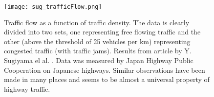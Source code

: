\begin{figure}[H]
    \begin{center}
    \texttt{[image: sug\_trafficFlow.png]}
    \caption{\label{sug_flow}
Traffic flow as a function of traffic density. The data is clearly divided
into two sets, one representing free flowing traffic and the other (above the
threshold of 25 vehicles per km) representing congested traffic (with traffic
jams).  Results from article by Y. Sugiyama el al. \cite{sugiyama}.  Data was
measured by Japan Highway Public Cooperation on Japanese highways. Similar
observations have been made in many places and seems to be almost a universal
property of highway traffic.}
    \end{center}
\end{figure}

